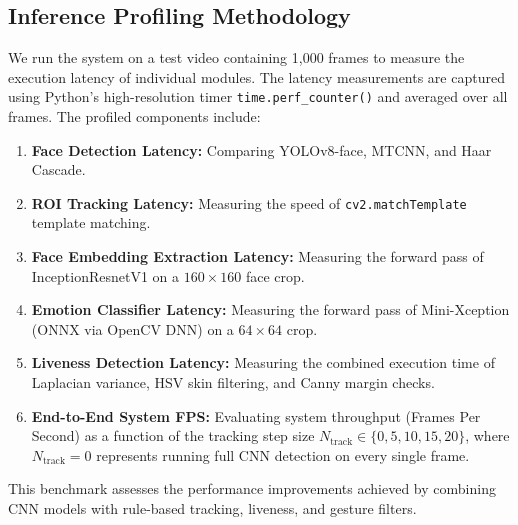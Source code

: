 \subsection{Inference Profiling Methodology}
We run the system on a test video containing 1,000 frames to measure the execution latency of individual modules. The latency measurements are captured using Python's high-resolution timer \texttt{time.perf_counter()} and averaged over all frames. The profiled components include:
\begin{enumerate}
    \item \textbf{Face Detection Latency:} Comparing YOLOv8-face, MTCNN, and Haar Cascade.
    \item \textbf{ROI Tracking Latency:} Measuring the speed of \texttt{cv2.matchTemplate} template matching.
    \item \textbf{Face Embedding Extraction Latency:} Measuring the forward pass of InceptionResnetV1 on a $160 \times 160$ face crop.
    \item \textbf{Emotion Classifier Latency:} Measuring the forward pass of Mini-Xception (ONNX via OpenCV DNN) on a $64 \times 64$ crop.
    \item \textbf{Liveness Detection Latency:} Measuring the combined execution time of Laplacian variance, HSV skin filtering, and Canny margin checks.
    \item \textbf{End-to-End System FPS:} Evaluating system throughput (Frames Per Second) as a function of the tracking step size $N_{\text{track}} \in \{0, 5, 10, 15, 20\}$, where $N_{\text{track}} = 0$ represents running full CNN detection on every single frame.
\end{enumerate}
This benchmark assesses the performance improvements achieved by combining CNN models with rule-based tracking, liveness, and gesture filters.
